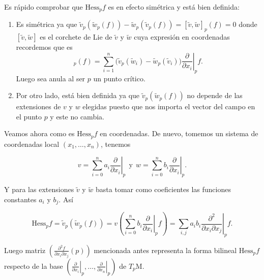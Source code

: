 \begin{remark}
    Es rápido comprobar que $\text{Hess}_{p}f$ es en efecto simétrica y está bien definida:

    \begin{enumerate}[label=(\roman*)]
        \item Es simétrica ya que $\tilde{v}_{p}(\tilde{w}_{p}(f)) - \tilde{w}_{p}(\tilde{v}_{p}(f)) = [\tilde{v},\tilde{w}]_{p}(f) = 0$ donde $[\tilde{v},\tilde{w}]$ es el corchete de Lie de $\tilde{v}$ y $\tilde{w}$ cuya expresión en coordenadas recordemos que es
        \begin{equation*}
            [\tilde{v},\tilde{w}]_{p}(f)=\sum_{i=1}^n \big( \tilde{v}_p(\tilde{w}_{i}) - \tilde{w}_p(\tilde{v}_{i}) \big) \left. \frac{\partial}{\partial x_{i}}\right|_p f.
        \end{equation*}
        Luego sea anula al ser $p$ un punto crítico.

        \item Por otro lado, está bien definida ya que $\tilde{v}_{p}(\tilde{w}_{p}(f))$ no depende de las extensiones de $v$ y $w$ elegidas puesto que nos importa el vector del campo en el punto $p$ y este no cambia.
    \end{enumerate}
\end{remark}
\bigskip

Veamos ahora como es $\text{Hess}_pf$ en coordenadas. De nuevo, tomemos un sistema de coordenadas local $(x_{1}, \dots ,x_{n})$, tenemos

\begin{equation*}
    v=\sum_{i=0}^n a_i \left.\frac{\partial}{\partial x_i}\right|_p ~~\text{y}~~ w=\sum_{i=0}^n b_i \left.\frac{\partial}{\partial x_i}\right|_p .
\end{equation*}

Y para las extensiones $\tilde{v}$ y $\tilde{w}$ basta tomar como coeficientes las funciones constantes $a_i$ y $b_j$. Así

\begin{equation*}
    \text{Hess}_pf= \tilde{v}_{p}(\tilde{w}_{p}(f)) = v\left(\sum_{i=0}^n b_i \left.\frac{\partial}{\partial x_i}\right|_p f\right)=\sum_{i,j} a_ib_i\left.\frac{\partial^{2}}{\partial x_i \partial x_j}\right|_p f .
\end{equation*}

Luego matriz $\left(\frac{\partial^{2}f}{\partial x_i \partial x_j}(p)\right)$ mencionada antes representa la forma bilineal $\text{Hess}_pf$ respecto de la base $\left( \left.\frac{\partial}{\partial x_i}\right|_p,\dots, \left.\frac{\partial}{\partial x_n}\right|_p \right)$ de $T_p\mathrm{M}$.
\bigskip

